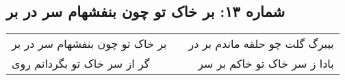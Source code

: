 \begin{center}
\section*{شماره ۱۳: بر خاک تو چون بنفشهام سر در بر}
\label{sec:013}
\begin{longtable}{l p{0.5cm} r}
بر خاک تو چون بنفشهام سر در بر
&&
بیبرگ گلت چو حلقه ماندم بر در
\\
گر از سر خاک تو بگردانم روی
&&
بادا ز سر خاک تو خاکم بر سر
\\
\end{longtable}
\end{center}
